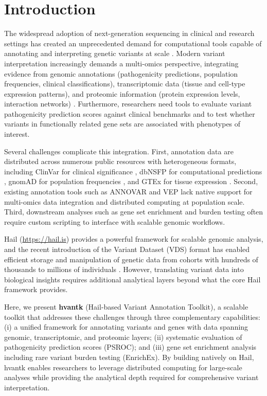 \documentclass[11pt]{article}
\begin{document}
\section{Introduction}

The widespread adoption of next-generation sequencing in clinical and research settings has created an unprecedented demand for computational tools capable of annotating and interpreting genetic variants at scale \citep{karczewski2020mutational}. Modern variant interpretation increasingly demands a multi-omics perspective, integrating evidence from genomic annotations (pathogenicity predictions, population frequencies, clinical classifications), transcriptomic data (tissue and cell-type expression patterns), and proteomic information (protein expression levels, interaction networks) \citep{ritchie2015methods}. Furthermore, researchers need tools to evaluate variant pathogenicity prediction scores against clinical benchmarks and to test whether variants in functionally related gene sets are associated with phenotypes of interest.

Several challenges complicate this integration. First, annotation data are distributed across numerous public resources with heterogeneous formats, including ClinVar for clinical significance \citep{landrum2018clinvar}, dbNSFP for computational predictions \citep{liu2020dbnsfp}, gnomAD for population frequencies \citep{karczewski2020mutational}, and GTEx for tissue expression \citep{gtex2020gtex}. Second, existing annotation tools such as ANNOVAR \citep{wang2010annovar} and VEP \citep{mclaren2016ensembl} lack native support for multi-omics data integration and distributed computing at population scale. Third, downstream analyses such as gene set enrichment and burden testing often require custom scripting to interface with scalable genomic workflows.

Hail (\url{https://hail.is}) provides a powerful framework for scalable genomic analysis, and the recent introduction of the Variant Dataset (VDS) format has enabled efficient storage and manipulation of genetic data from cohorts with hundreds of thousands to millions of individuals \citep{king2024svcr}. However, translating variant data into biological insights requires additional analytical layers beyond what the core Hail framework provides.

Here, we present \textbf{hvantk} (Hail-based Variant Annotation Toolkit), a scalable toolkit that addresses these challenges through three complementary capabilities: (i) a unified framework for annotating variants and genes with data spanning genomic, transcriptomic, and proteomic layers; (ii) systematic evaluation of pathogenicity prediction scores (PSROC); and (iii) gene set enrichment analysis including rare variant burden testing (EnrichEx). By building natively on Hail, hvantk enables researchers to leverage distributed computing for large-scale analyses while providing the analytical depth required for comprehensive variant interpretation.
\end{document}

